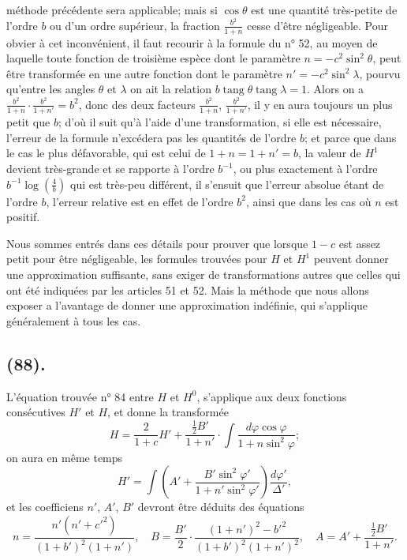 \documentclass{article}
\begin{document}
méthode précédente sera applicable; mais si $\cos\theta$ est une quantité très-petite de l'ordre $b$ ou d'un ordre supérieur, la fraction $\frac{b^{2}}{1+n}$ cesse d'être négligeable. Pour obvier à cet inconvénient, il faut recourir à la formule du n° 52, au moyen de laquelle toute fonction de troisième espèce dont le paramètre $n=-c^{2}\sin^{2}\theta$, peut être transformée en une autre fonction dont le paramètre $n'=-c^{2}\sin^{2}\lambda$, pourvu qu'entre les angles $\theta$ et $\lambda$ on ait la relation $b\operatorname{tang}\theta\operatorname{tang}\lambda=1$. Alors on a $\frac{b^{2}}{1+n}\cdot\frac{b^{2}}{1+n'}=b^{2}$, donc des deux facteurs $\frac{b^{2}}{1+n}$, $\frac{b^{2}}{1+n'}$, il y en aura toujours un plus petit que $b$; d'où il suit qu'à l'aide d'une transformation, si elle est nécessaire, l'erreur de la formule n'excédera pas les quantités de l'ordre $b$; et parce que dans le cas le plus défavorable, qui est celui de $1+n=1+n'=b$, la valeur de $H^{1}$ devient très-grande et se rapporte à l'ordre $b^{-1}$, ou plus exactement à l'ordre $b^{-1}\log\left(\frac{4}{b}\right)$ qui est très-peu différent, il s'ensuit que l'erreur absolue étant de l'ordre $b$, l'erreur relative est en effet de l'ordre $b^{2}$, ainsi que dans les cas où $n$ est positif.

Nous sommes entrés dans ces détails pour prouver que lorsque $1-c$ est assez petit pour être négligeable, les formules trouvées pour $H$ et $H^{1}$ peuvent donner une approximation suffisante, sans exiger de transformations autres que celles qui ont été indiquées par les articles 51 et 52. Mais la méthode que nous allons exposer a l'avantage de donner une approximation indéfinie, qui s'applique généralement à tous les cas.

\subsection*{(88).}

L'équation trouvée n° 84 entre $H$ et $H^{0}$, s'applique aux deux fonctions consécutives $H'$ et $H$, et donne la transformée
\[ H=\frac{2}{1+c}H'+\frac{\tfrac{1}{2}B'}{1+n'}\cdot\int\frac{d\varphi\cos\varphi}{1+n\sin^{2}\varphi}; \]
on aura en même temps
\[ H'=\int\left(A'+\frac{B'\sin^{2}\varphi'}{1+n'\sin^{2}\varphi'}\right)\frac{d\varphi'}{\Delta'}, \]
et les coefficiens $n'$, $A'$, $B'$ devront être déduits des équations
\[ n=\frac{n'(n'+c'^{2})}{(1+b')^{2}(1+n')},\quad B=\frac{B'}{2}\cdot\frac{(1+n')^{2}-b'^{2}}{(1+b')^{2}(1+n')^{2}},\quad A=A'+\frac{\tfrac{1}{2}B'}{1+n'}. \]
\end{document}
